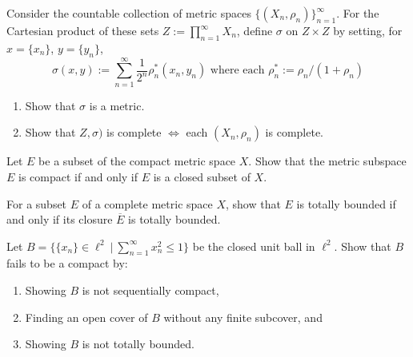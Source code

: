 \begin{problem}
	Consider the countable collection of metric spaces \( \{ (X_n, \rho_n ) \}_{n=1}^\infty \). For the Cartesian product of these sets \( Z := \prod_{n=1}^\infty X_n \), define \( \sigma \) on \( Z\times Z \) by setting, for \( x = \{ x_n \} \), \( y = \{ y_n \} \), 
	\[
		\sigma(x,y) := \sum_{n=1}^\infty \frac{1}{2^n} \rho^*_n(x_n, y_n) \text{ where each } \rho^*_n := \rho_n / (1+\rho_n) 
	\]
	\begin{enumerate}[a]
		\item Show that \( \sigma \) is a metric. 
		\item Show that \( Z, \sigma) \)  is complete \( \iff \) each \( (X_n, \rho_n) \) is complete. 
	\end{enumerate}
\end{problem}

\begin{problem}
	Let \( E \) be a subset of the compact metric space \( X \). Show that the metric subspace \( E \) is compact if and only if \( E \) is a closed subset of \( X \). 
\end{problem}

\begin{problem}
	For a subset \( E \) of a complete metric space \( X \), show that \( E \) is totally bounded if and only if its closure \( \overline{E} \) is totally bounded. 
\end{problem}

\begin{problem}
	Let \( B = \{ \{ x_n \} \in \ell^2\ |\ \sum_{n=1}^\infty x_n^2 \leq 1 \} \) be the closed unit ball in \( \ell^2 \). Show that \( B \) fails to be a compact by: 
	\begin{enumerate}[a]
		\item Showing \( B \) is not sequentially compact, 
		\item Finding an open cover of \( B \) without any finite subcover, and 
		\item Showing \( B \) is not totally bounded. 
	\end{enumerate}
\end{problem}

